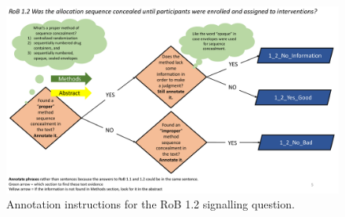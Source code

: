 \documentclass[sn-mathphys,Numbered]{sn-jnl}%
\begin{document}
%
%
%
\begin{figure}[hbt]
    \centering
    \includegraphics[width=\textwidth]{figures/1_2.pdf}
    \caption{Annotation instructions for the RoB 1.2 signalling question.}
    \label{fig:1_2}
\end{figure}
%
%
%
\end{document}
